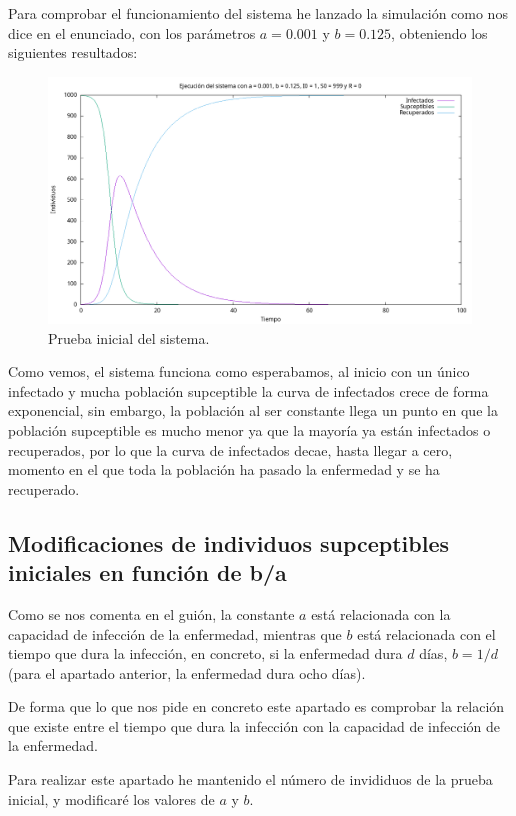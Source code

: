 \documentclass[12pt, spanish]{article}
\begin{document}
Para comprobar el funcionamiento del sistema he lanzado la simulación como nos dice en el enunciado, con los parámetros $a = 0.001$ y $b = 0.125$, obteniendo los siguientes resultados:

\begin{figure}[H]
  \centering
      \includegraphics[width=\textwidth]{SIR_prueba_basica.png}
 		\caption{Prueba inicial del sistema.}
\end{figure}

Como vemos, el sistema funciona como esperabamos, al inicio con un único infectado y mucha población supceptible la curva de infectados crece de forma exponencial, sin embargo, la población al ser constante llega un punto en que la población supceptible es mucho menor ya que la mayoría ya están infectados o recuperados, por lo que la curva de infectados decae, hasta llegar a cero, momento en el que toda la población ha pasado la enfermedad y se ha recuperado.

\subsection{Modificaciones de individuos supceptibles iniciales en función de b/a}

Como se nos comenta en el guión, la constante $a$ está relacionada con la capacidad de infección de la enfermedad, mientras que $b$ está relacionada con el tiempo que dura la infección, en concreto, si la enfermedad dura $d$ días, $b = 1/d$ (para el apartado anterior, la enfermedad dura ocho días). 

De forma que lo que nos pide en concreto este apartado es comprobar la relación que existe entre el tiempo que dura la infección con la capacidad de infección de la enfermedad. 

Para realizar este apartado he mantenido el número de invididuos de la prueba inicial, y modificaré los valores de $a$ y $b$.
\end{document}
